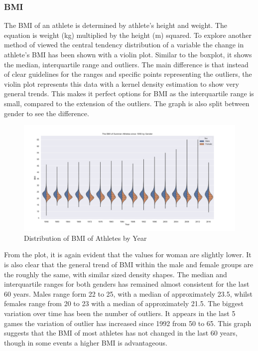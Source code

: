 \documentclass[a4 paper, 12pt]{article}
\begin{document}
        \subsubsection{BMI}
        The BMI of an athlete is determined by athlete's height and weight. The equation is weight (kg) multiplied by the height (m) squared. To explore another method of viewed the central tendency distribution of a variable the change in athlete's BMI has been shown with a violin plot. Similar to the boxplot, it shows the median, interquartile range and outliers. The main difference is that instead of clear guidelines for the ranges and specific points representing the outliers, the violin plot represents this data with a kernel density estimation to show very general trends. This makes it perfect options for BMI as the interquartile range is small, compared to the extension of the outliers. The graph is also split between gender to see the difference. 
        \begin{figure} [H]
            \centering
            \includegraphics[width=\textwidth, frame]
                {./images/graph/athlete_BMI_violinplot.png}      
                \caption{Distribution of BMI of Athletes by Year} 
        \end{figure}
        From the plot, it is again evident that the values for woman are slightly lower. It is also clear that the general trend of BMI within the male and female groups are the roughly the same, with similar sized density shapes. The median and interquartile ranges for both genders has remained almost consistent for the last 60 years. Males range form 22 to 25, with a median of approximately 23.5, whilst females range from 20 to 23 with a median of approximately 21.5. The biggest variation over time has been the number of outliers. It appears in the last 5 games the variation of outlier has increased since 1992 from 50 to 65. This graph suggests that the BMI of most athletes has not changed in the last 60 years, though in some events a higher BMI is advantageous.
\end{document}
